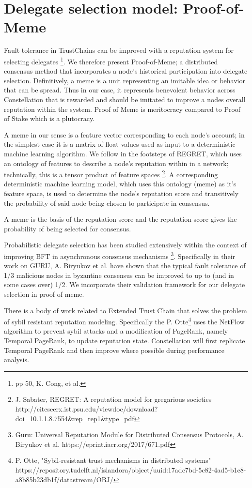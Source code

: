 \documentclass{article}
\begin{document}
\section{Delegate selection model: Proof-of-Meme}
Fault tolerance in TrustChains can be improved with a reputation system for selecting delegates \footnote{pp 50, K. Cong, et al.}. We therefore present Proof-of-Meme; a distributed consensus method that incorporates a node's historical participation into delegate selection. Definitively, a meme is a unit representing an imitable idea or behavior that can be spread. Thus in our case, it represents benevolent behavior across Constellation that is rewarded and should be imitated to improve a nodes overall reputation within the system. Proof of Meme is meritocracy compared to Proof of Stake which is a plutocracy.

A meme in our sense is a feature vector corresponding to each node's account; in the simplest case it is a matrix of float values used as input to a deterministic machine learning algorithm. We follow in the footsteps of REGRET, which uses an ontology of features to describe a node's reputation within in a network; technically, this is a tensor product of feature spaces \footnote{J. Sabater, REGRET: A reputation model for gregarious societies http://citeseerx.ist.psu.edu/viewdoc/download?doi=10.1.1.8.7554&rep=rep1&type=pdf}. A corresponding deterministic machine learning model, which uses this ontology (meme) as it's feature space, is used to determine the node's reputation score and transitively the probability of said node being chosen to participate in consensus. 

A meme is the basis of the reputation score and the reputation score gives the probability of being selected for consensus.

Probabilistic delegate selection has been studied extensively within the context of improving BFT in asynchronous consensus mechanisms \footnote{Guru: Universal Reputation Module for Distributed Consensus Protocols, A. Biryukov et al. https://eprint.iacr.org/2017/671.pdf}. Specifically in their work on GURU, A. Biryukov et al. have shown that the typical fault tolerance of 1/3 malicious nodes in byzantine consensus can be improved to up to (and in some cases over) 1/2. We incorporate their validation framework for our delegate selection in proof of meme.

There is a body of work related to Extended Trust Chain that solves the problem of sybil resistant reputation modeling. Specifically the P. Otte\footnote{P. Otte, "Sybil-resistant trust mechanisms in distributed systems" https://repository.tudelft.nl/islandora/object/uuid:17adc7bd-5c82-4ad5-b1c8-a8b85b23db1f/datastream/OBJ/} uses the NetFlow algorithm to prevent sybil attacks and a modification of PageRank, namely Temporal PageRank, to update reputation state. Constellation will first replicate Temporal PageRank and then improve where possible during performance analysis.
\end{document}
